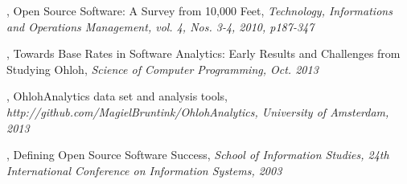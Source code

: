 \begin{thebibliography}{99}

	 \rm, Open Source Software: A Survey from 10,000
		Feet, \emph{Technology, Informations and Operations Management, vol. 4, Nos.
		3-4, 2010, p187-347}\rm

\begin{comment}
		This 'paper' of 160 pages gives a wide overview of the OSS eco-system. It
		provides insight in the history and how and why the OSS community works, who
		is involved, and the impact on the software community in general. It even
		gives insight in the business models and adoption by the industry. The
		information gives a solid background to the Master's project to understand
		the results found by the study.
\end{comment}
		
	 \rm, Towards Base Rates in Software
		Analytics: Early Results and Challenges from Studying Ohloh, \emph{Science of
		Computer Programming, Oct. 2013}\rm

\begin{comment}
		The data set that was collected here is a subset of the ohloh universe using
		validation techniques as described by Nagappan et al.
\end{comment}

	 \rm, OhlohAnalytics data set
		and analysis tools, \emph{http://github.com/MagielBruntink/OhlohAnalytics,
		University of Amsterdam, 2013}\rm

	 \rm,
		Defining Open Source Software Success, \emph{School of Information Studies,
		24th International Conference on Information Systems, 2003}\rm

\begin{comment}
		Crowston et al. identified a range of measures that can be used to assess the
		success of OSS projects. They identified measures based on a review of the
		literature, a consideration of the OSS development process, and an analysis of
		the opinions of OSS developers. For each measure, they provided examples of
		how they might be used in a study of OSS development.

		The relation with this Master's project is to be able to measure the success
		of an OSS project. Some measures from the paper cannot be used in this study
		because they require personal interaction with inidividual developers.
		However, some other measures are useful. Such as the number of developers, the
		individual level of activity, and cycle time.
\end{comment}


\end{thebibliography}
